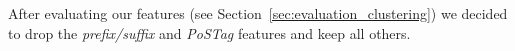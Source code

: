 After evaluating our features (see Section~\ref{sec:evaluation_clustering}) we decided to drop the \textit{prefix/suffix} and \textit{PoSTag} features and keep all others.



